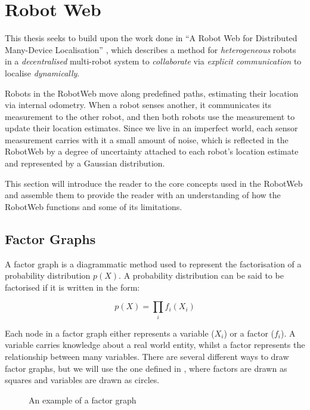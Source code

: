\section{Robot Web}
This thesis seeks to build upon the work done in ``A Robot Web for Distributed Many-Device Localisation'' \cite{Robotweb}, which describes a method for \textit{heterogeneous} robots in a \textit{decentralised} multi-robot system to \textit{collaborate} via \textit{explicit communication} to localise \textit{dynamically}.

Robots in the RobotWeb move along predefined paths, estimating their location via internal odometry. When a robot senses another, it communicates its measurement to the other robot, and then both robots use the measurement to update their location estimates. Since we live in an imperfect world, each sensor measurement carries with it a small amount of noise, which is reflected in the RobotWeb by a degree of uncertainty attached to each robot's location estimate and represented by a Gaussian distribution.

This section will introduce the reader to the core concepts used in the RobotWeb and assemble them to provide the reader with an understanding of how the RobotWeb functions and some of its limitations.

\subsection{Factor Graphs} 
A factor graph is a diagrammatic method used to represent the factorisation of a probability distribution $p(X)$. A probability distribution can be said to be factorised if it is written in the form:

\begin{equation}
p(X) = \underset{i}{\prod} f_i(X_i)
\end{equation}

Each node in a factor graph either represents a variable ($X_i$) or a factor ($f_i$). A variable carries knowledge about a real world entity, whilst a factor represents the relationship between many variables. There are several different ways to draw factor graphs, but we will use the one defined in \cite{FactorGraphDrawingFormat}, where factors are drawn as squares and variables are drawn as circles.

\begin{figure}[!h]
    \centering
    

    \caption[Example factor graph]{An example of a factor graph}
\end{figure}

